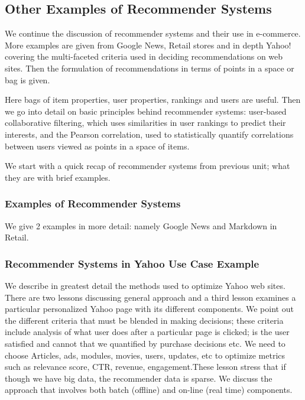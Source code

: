 


\subsection{Other Examples of Recommender Systems}

We continue the discussion of recommender systems and their use in
e-commerce. More examples are given from Google News, Retail stores and
in depth Yahoo! covering the multi-faceted criteria used in deciding
recommendations on web sites. Then the formulation of recommendations in
terms of points in a space or bag is given.

Here bags of item properties, user properties, rankings and users are
useful. Then we go into detail on basic principles behind recommender
systems: user-based collaborative filtering, which uses similarities in
user rankings to predict their interests, and the Pearson correlation,
used to statistically quantify correlations between users viewed as
points in a space of items.



We start with a quick recap of recommender systems from previous unit;
what they are with brief examples.


\subsubsection{Examples of Recommender Systems}

We give 2 examples in more detail: namely Google News and Markdown in
Retail.



\subsubsection{Recommender Systems in Yahoo Use Case
Example}

We describe in greatest detail the methods used to optimize Yahoo web
sites. There are two lessons discussing general approach and a third
lesson examines a particular personalized Yahoo page with its different
components. We point out the different criteria that must be blended in
making decisions; these criteria include analysis of what user does
after a particular page is clicked; is the user satisfied and cannot
that we quantified by purchase decisions etc. We need to choose
Articles, ads, modules, movies, users, updates, etc to optimize metrics
such as relevance score, CTR, revenue, engagement.These lesson stress
that if though we have big data, the recommender data is sparse. We
discuss the approach that involves both batch (offline) and on-line
(real time) components.

